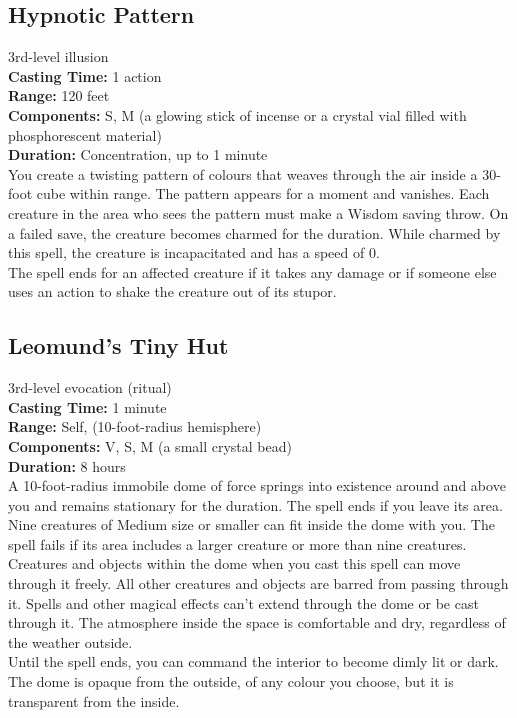 \documentclass[11pt, A4paper, english]{article}
\begin{document}
		\subsection{Hypnotic Pattern}
3rd-level illusion \\
\textbf{Casting Time:} 1 action \\
\textbf{Range:} 120 feet \\
\textbf{Components:} S, M (a glowing stick of incense or a crystal vial filled with phosphorescent material) \\
\textbf{Duration:} Concentration, up to 1 minute \\
You create a twisting pattern of colours that weaves through the air inside a 30-foot cube within range. The pattern appears for a moment and vanishes. Each creature in the area who sees the pattern must make a Wisdom saving throw. On a failed save, the creature becomes charmed for the duration. While charmed by this spell, the creature is incapacitated and has a speed of 0. \\
The spell ends for an affected creature if it takes any damage or if someone else uses an action to shake the creature out of its stupor.

		\subsection{Leomund's Tiny Hut}
3rd-level evocation (ritual) \\
\textbf{Casting Time:} 1 minute \\
\textbf{Range:} Self, (10-foot-radius hemisphere) \\
\textbf{Components:} V, S, M (a small crystal bead) \\
\textbf{Duration:} 8 hours \\
A 10-foot-radius immobile dome of force springs into existence around and above you and remains stationary for the duration. The spell ends if you leave its area. \\
Nine creatures of Medium size or smaller can fit inside the dome with you. The spell fails if its area includes a larger creature or more than nine creatures. Creatures and objects within the dome when you cast this spell can move through it freely. All other creatures and objects are barred from passing through it. Spells and other magical effects can’t extend through the dome or be cast through it. The atmosphere inside the space is comfortable and dry, regardless of the weather outside. \\
Until the spell ends, you can command the interior to become dimly lit or dark. The dome is opaque from the outside, of any colour you choose, but it is transparent from the inside.
\end{document}
